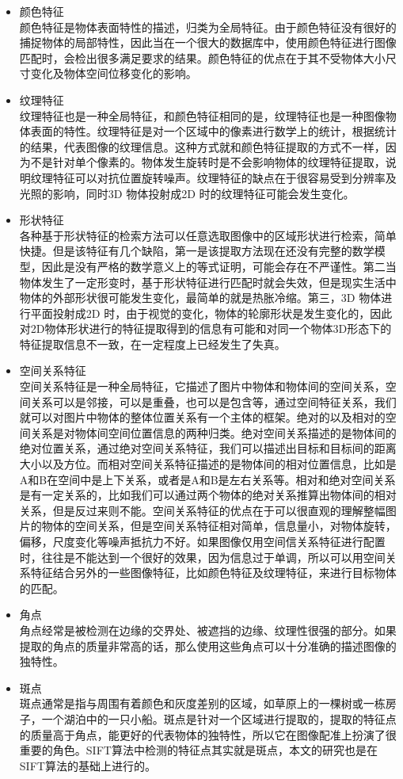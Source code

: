 \begin{itemize}
\item 颜色特征\\颜色特征是物体表面特性的描述，归类为全局特征。由于颜色特征没有很好的捕捉物体的局部特性，因此当在一个很大的数据库中，使用颜色特征进行图像匹配时，会检出很多满足要求的结果。颜色特征的优点在于其不受物体大小尺寸变化及物体空间位移变化的影响。
\item 纹理特征\\纹理特征也是一种全局特征，和颜色特征相同的是，纹理特征也是一种图像物体表面的特性。纹理特征是对一个区域中的像素进行数学上的统计，根据统计的结果，代表图像的纹理信息。这种方式就和颜色特征提取的方式不一样，因为不是针对单个像素的。物体发生旋转时是不会影响物体的纹理特征提取，说明纹理特征可以对抗位置旋转噪声。纹理特征的缺点在于很容易受到分辨率及光照的影响，同时3D 物体投射成2D 时的纹理特征可能会发生变化。
\item 形状特征\\各种基于形状特征的检索方法可以任意选取图像中的区域形状进行检索，简单快捷。但是该特征有几个缺陷，第一是该提取方法现在还没有完整的数学模型，因此是没有严格的数学意义上的等式证明，可能会存在不严谨性。第二当物体发生了一定形变时，基于形状特征进行匹配时就会失效，但是现实生活中物体的外部形状很可能发生变化，最简单的就是热胀冷缩。第三，3D 物体进行平面投射成2D 时，由于视觉的变化，物体的轮廓形状是发生变化的，因此对2D物体形状进行的特征提取得到的信息有可能和对同一个物体3D形态下的特征提取信息不一致，在一定程度上已经发生了失真。
\item 空间关系特征\\空间关系特征是一种全局特征，它描述了图片中物体和物体间的空间关系，空间关系可以是邻接，可以是重叠，也可以是包含等，通过空间特征关系，我们就可以对图片中物体的整体位置关系有一个主体的框架。绝对的以及相对的空间关系是对物体间空间位置信息的两种归类。绝对空间关系描述的是物体间的绝对位置关系，通过绝对空间关系特征，我们可以描述出目标和目标间的距离大小以及方位。而相对空间关系特征描述的是物体间的相对位置信息，比如是A和B在空间中是上下关系，或者是A和B是左右关系等。相对和绝对空间关系是有一定关系的，比如我们可以通过两个物体的绝对关系推算出物体间的相对关系，但是反过来则不能。空间关系特征的优点在于可以很直观的理解整幅图片的物体的空间关系，但是空间关系特征相对简单，信息量小，对物体旋转，偏移，尺度变化等噪声抵抗力不好。如果图像仅用空间信关系特征进行配置时，往往是不能达到一个很好的效果，因为信息过于单调，所以可以用空间关系特征结合另外的一些图像特征，比如颜色特征及纹理特征，来进行目标物体的匹配。
\item 角点 \\角点经常是被检测在边缘的交界处、被遮挡的边缘、纹理性很强的部分。如果提取的角点的质量非常高的话，那么使用这些角点可以十分准确的描述图像的独特性。
\item 斑点\\斑点通常是指与周围有着颜色和灰度差别的区域，如草原上的一棵树或一栋房子，一个湖泊中的一只小船。斑点是针对一个区域进行提取的，提取的特征点的质量高于角点，能更好的代表物体的独特性，所以它在图像配准上扮演了很重要的角色。SIFT算法中检测的特征点其实就是斑点，本文的研究也是在SIFT算法的基础上进行的。
\end{itemize}
